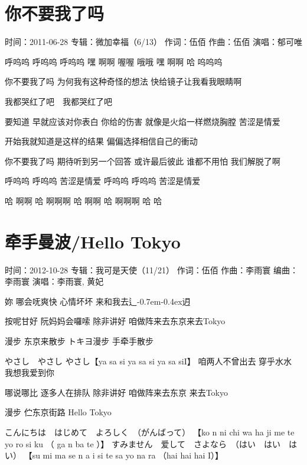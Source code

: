 \documentclass[UTF8,a4paper,oneside,twocolumn,12pt]{ctexbook}
\newcommand{\infopair}[2]{\textbullet #1：#2}
\newcommand{\zc}[1][伍佰]{\infopair{作词}{#1}}
\newcommand{\zq}[1][伍佰]{\infopair{作曲}{#1}}
\newcommand{\bq}[1][伍佰]{\infopair{编曲}{#1}}
\newcommand{\zj}[1]{\infopair{专辑}{#1}}
\newcommand{\sj}[1]{\infopair{时间}{#1}}
\newcommand{\tshittho}{\hbox{辶\kern-0.7em\lower-0.4ex\hbox{\scalebox{0.7}{日}}}迌}
\newenvironment{info}{\begin{flushleft}\kaishu
	}
	{\end{flushleft}\normalsize\yahei\par}
\newenvironment{lyric}{
	}
{}
\begin{document}
\section{你不要我了吗}
\begin{info}
	\sj{2011-06-28}
	\zj{微加幸福（6/13）}
	\zc
	\zq
	\infopair{演唱}{郁可唯}
\end{info}
\begin{lyric}
	呼呜呜 呼呜呜 呼呜呜
	嘿 啊啊 喔喔 哦哦
	嘿 啊啊 哈 呜呜呜

	你不要我了吗  为何我有这种奇怪的想法
	快给镜子让我看我眼睛啊

	我都哭红了吧　我都哭红了吧

	要知道 早就应该对你表白
	你给的伤害 就像是火焰一样燃烧胸膛 苦涩是情爱

	开始我就知道是这样的结果
	偏偏选择相信自己的衝动

	你不要我了吗  期待听到另一个回答
	或许最后彼此  谁都不用怕  我们解脱了啊

	呼呜呜 呼呜呜  苦涩是情爱
	呼呜呜 呼呜呜  苦涩是情爱

	哈 啊啊 哈 啊啊啊
	哈 啊啊 哈 啊啊啊 哈 哈
\end{lyric}

\section{牵手曼波/Hello Tokyo}
\begin{info}
	\sj{2012-10-28}
	\zj{我可是天使（11/21）}
	\zc
	\zq[李雨寰]
	\bq[李雨寰]
	\infopair{演唱}{李雨寰, 黄妃}
\end{info}
\begin{lyric}
	妳 哪会呒爽快 心情坏坏
	来和我去\tshittho{}

	按呢甘好 阮妈妈会囉嗦
	除非讲好 咱做阵来去东京来去Tokyo

	漫步 东京来散步
	トキヨ漫步 手牵手散步

	やさし　やさし やさし【ya sa si ya sa si ya sa siI】
	咱两人不曾出去 穿乎水水
	我想我爱到你

	哪说哪比 逐多人在排队
	除非讲好 咱做阵来去东京 来去Tokyo

	漫步 伫东京街路 Hello Tokyo

	こんにちは　はじめて　よろしく　（がんばって）
	【ko n ni chi wa ha ji me te yo ro si ku （ ga n ba te ）】
	すみません　爱して　さよなら　（はい　はい　はい）
	【su mi ma se n a i si te sa yo na ra （hai hai hai I）】
\end{lyric}
\end{document}
